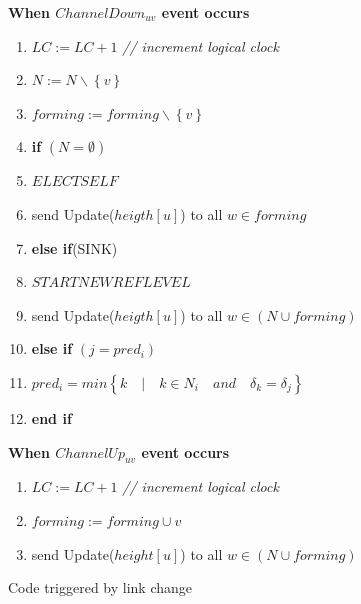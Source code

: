 \documentclass{article}
\begin{document}
\newpage
\begin{figure}[hbtp]
\textbf{When $ChannelDown_{uv}$ event occurs}

\begin{enumerate}
\item \quad $LC := LC + 1$   \textit{// increment logical clock}
\item \quad $ N := N\backslash \left\lbrace v\right\rbrace $
\item \quad $ forming := forming \backslash \left\lbrace v\right\rbrace $
\item \quad \textbf{if} $ (N = \emptyset )$
\item \quad \quad $ELECTSELF$
\item \quad \quad send Update($heigth[u]$) to all $ w\in forming$
\item \quad \textbf{else if}(SINK)
\item \quad \quad $STARTNEWREFLEVEL$
\item \quad \quad send Update($heigth[u]$) to all $w\in (N \cup forming)$
\item \quad \textbf{else if} $(j=pred_i)$
\item \quad \quad $pred_i=min \left\lbrace k \quad \vert \quad k\in N_i \quad and \quad \delta_k = \delta_j \right\rbrace$
\item \quad \textbf{end if}
\end{enumerate}


\textbf{When $ChannelUp_{uv}$ event occurs}

\begin{enumerate}
\item \quad $LC := LC + 1$   \textit{// increment logical clock}
\item \quad $forming := forming \cup {v}$
\item \quad send Update($height[u]$) to all $ w \in (N \cup forming)$
\end{enumerate}
\caption{Code triggered by link change}
\end{figure}
\end{document}
